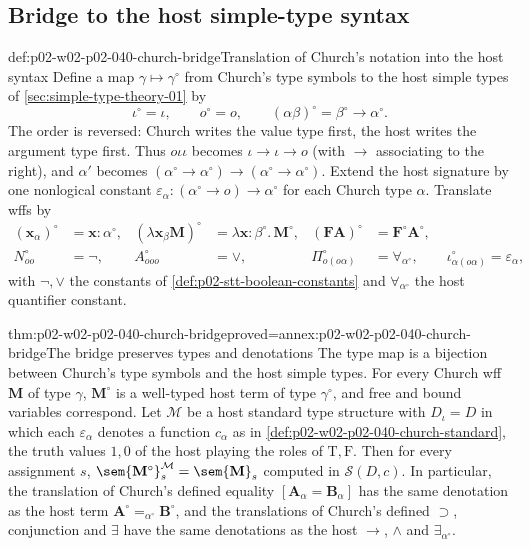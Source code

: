 \subsection{Bridge to the host simple-type syntax}

\begin{hbdefinition}{def:p02-w02-p02-040-church-bridge}{Translation of Church's notation into the host syntax}
Define a map \(\gamma\mapsto\gamma^\circ\) from Church's type symbols to the
host simple types of \cref{sec:simple-type-theory-01} by
\[
 \iota^\circ=\iota,\qquad o^\circ=o,\qquad
 (\alpha\beta)^\circ=\beta^\circ\to\alpha^\circ.
\]
The order is reversed: Church writes the value type first, the host writes
the argument type first.  Thus \(o\iota\iota\) becomes
\(\iota\to\iota\to o\) (with \(\to\) associating to the right), and
\(\alpha'\) becomes \((\alpha^\circ\to\alpha^\circ)\to(\alpha^\circ\to\alpha^\circ)\).
Extend the host signature by one nonlogical constant
\(\varepsilon_\alpha:(\alpha^\circ\to o)\to\alpha^\circ\) for each Church type
\(\alpha\).  Translate wffs by
\[
\begin{aligned}
 (\mathbf x_\alpha)^\circ&=\mathbf x{:}\alpha^\circ,
 &(\lambda\mathbf x_\beta\mathbf M)^\circ&=\lambda\mathbf x{:}\beta^\circ.\,\mathbf M^\circ,
 &(\mathbf F\mathbf A)^\circ&=\mathbf F^\circ\mathbf A^\circ,\\
 N_{oo}^\circ&=\neg,
 &A_{ooo}^\circ&=\lor,
 &\Pi_{o(o\alpha)}^\circ&=\forall_{\alpha^\circ},
 \qquad\iota_{\alpha(o\alpha)}^\circ=\varepsilon_\alpha,
\end{aligned}
\]
with \(\neg,\lor\) the constants of \cref{def:p02-stt-boolean-constants} and
\(\forall_{\alpha^\circ}\) the host quantifier constant.
\end{hbdefinition}

\begin{hbtheorem}{thm:p02-w02-p02-040-church-bridge}{proved=annex:p02-w02-p02-040-church-bridge}{The bridge preserves types and denotations}
The type map is a bijection between Church's type symbols and the host
simple types.  For every Church wff \(\mathbf M\) of type \(\gamma\),
\(\mathbf M^\circ\) is a well-typed host term of type \(\gamma^\circ\), and
free and bound variables correspond.  Let \(\mathcal M\) be a host standard
type structure with \(D_\iota=D\) in which each \(\varepsilon_\alpha\)
denotes a function \(c_\alpha\) as in
\cref{def:p02-w02-p02-040-church-standard}, the truth values \(1,0\) of the
host playing the roles of \(\mathrm T,\mathrm F\).  Then for every
assignment \(s\),
\(\sem{\mathbf M^\circ}^{\mathcal M}_s=\sem{\mathbf M}_s\) computed in
\(\mathcal S(D,c)\).  In particular, the translation of Church's defined
equality \([\mathbf A_\alpha=\mathbf B_\alpha]\) has the same denotation as
the host term \(\mathbf A^\circ=_{\alpha^\circ}\mathbf B^\circ\), and the
translations of Church's defined \(\supset\), conjunction and \(\exists\)
have the same denotations as the host \(\to\), \(\land\) and
\(\exists_{\alpha^\circ}\).
\end{hbtheorem}

